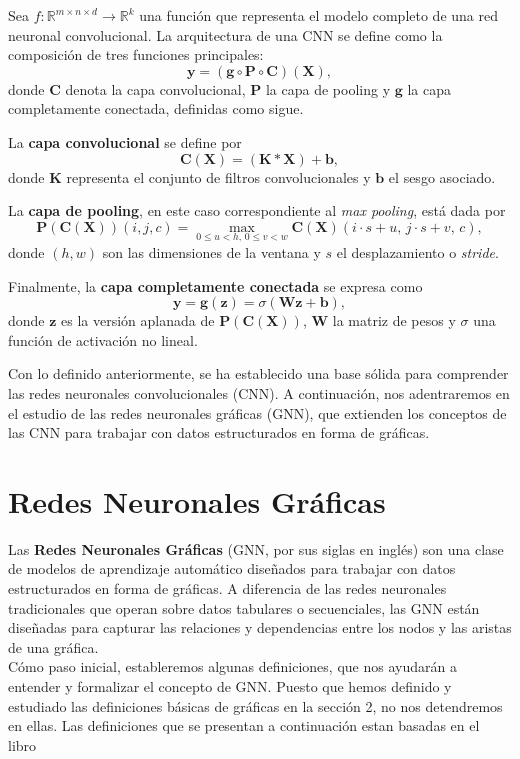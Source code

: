 \begin{definition}

    Sea $f: \mathbb{R}^{m \times n \times d} \longrightarrow \mathbb{R}^k$ una función que representa el modelo completo de una red neuronal convolucional.
    La arquitectura de una CNN se define como la composición de tres funciones principales:
    \[
        \mathbf{y} = (\mathbf{g} \circ \mathbf{P} \circ \mathbf{C})(\mathbf{X}),
    \]
    donde $\mathbf{C}$ denota la capa convolucional, $\mathbf{P}$ la capa de pooling y $\mathbf{g}$ la capa completamente conectada, definidas como sigue.

    La \textbf{capa convolucional} se define por
    \[
        \mathbf{C}(\mathbf{X}) = (\mathbf{K} \ast \mathbf{X}) + \mathbf{b},
    \]
    donde $\mathbf{K}$ representa el conjunto de filtros convolucionales y $\mathbf{b}$ el sesgo asociado.

    La \textbf{capa de pooling}, en este caso correspondiente al \textit{max pooling}, está dada por
    \[
        \mathbf{P}(\mathbf{C}(\mathbf{X}))(i,j,c) =
        \max_{0 \leq u < h ,\, 0 \leq v < w}
        \mathbf{C}(\mathbf{X})(i \cdot s + u,\, j \cdot s + v,\, c),
    \]
    donde $(h,w)$ son las dimensiones de la ventana y $s$ el desplazamiento o \textit{stride}.

    Finalmente, la \textbf{capa completamente conectada} se expresa como
    \[
        \mathbf{y} = \mathbf{g}(\mathbf{z}) = \sigma(\mathbf{W}\mathbf{z} + \mathbf{b}),
    \]
    donde $\mathbf{z}$ es la versión aplanada de $\mathbf{P}(\mathbf{C}(\mathbf{X}))$, $\mathbf{W}$ la matriz de pesos y $\sigma$ una función de activación no lineal.
\end{definition}

Con lo definido anteriormente, se ha establecido una base sólida para comprender las redes neuronales convolucionales (CNN). A continuación, nos adentraremos en el estudio de las redes neuronales gráficas (GNN), que extienden los conceptos de las CNN para trabajar con datos estructurados en forma de gráficas.

\section{Redes Neuronales Gráficas}

Las \textbf{Redes Neuronales Gráficas} (GNN, por sus siglas en inglés) son una clase de modelos de aprendizaje automático diseñados para trabajar con datos estructurados en forma de gráficas. A diferencia de las redes neuronales tradicionales que operan sobre datos tabulares o secuenciales, las GNN están diseñadas para capturar las relaciones y dependencias entre los nodos y las aristas de una gráfica.\\
Cómo paso inicial, estableremos algunas definiciones, que nos ayudarán a entender y formalizar el concepto de GNN.
Puesto que hemos definido y estudiado las definiciones básicas de gráficas en la sección 2, no nos detendremos en ellas.
Las definiciones que se presentan a continuación estan basadas en el libro \cite{graph_representation_learning}
